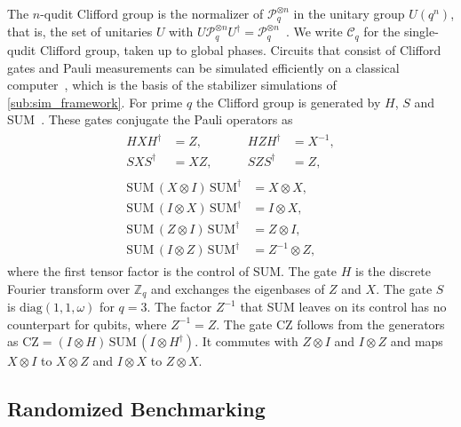 The $n$-qudit Clifford group is the normalizer of $\mathcal{P}_q^{\otimes n}$ in the unitary group $U(q^n)$, that is, the set of unitaries $U$ with $U \mathcal{P}_q^{\otimes n} U^\dagger = \mathcal{P}_q^{\otimes n}$~\cite{Gottesman1999}. We write $\mathcal{C}_q$ for the single-qudit Clifford group, taken up to global phases. Circuits that consist of Clifford gates and Pauli measurements can be simulated efficiently on a classical computer~\cite{Gottesman1998}, which is the basis of the stabilizer simulations of \autoref{sub:sim_framework}. For prime $q$ the Clifford group is generated by $H$, $S$ and SUM~\cite{Hostens2005}. These gates conjugate the Pauli operators as
\begin{equation}
  \begin{gathered}
    \begin{aligned}
      H X H^\dagger &= Z, &\qquad H Z H^\dagger &= X^{-1}, \\
      S X S^\dagger &= X Z, &\qquad S Z S^\dagger &= Z,
    \end{aligned} \\
    \begin{aligned}
      \mathrm{SUM}\,(X \otimes I)\,\mathrm{SUM}^\dagger &= X \otimes X, \\
      \mathrm{SUM}\,(I \otimes X)\,\mathrm{SUM}^\dagger &= I \otimes X, \\
      \mathrm{SUM}\,(Z \otimes I)\,\mathrm{SUM}^\dagger &= Z \otimes I, \\
      \mathrm{SUM}\,(I \otimes Z)\,\mathrm{SUM}^\dagger &= Z^{-1} \otimes Z,
    \end{aligned}
  \end{gathered}
  \label{eq:bg-conjugation}
\end{equation}
where the first tensor factor is the control of SUM. The gate $H$ is the discrete Fourier transform over $\mathbb{Z}_q$ and exchanges the eigenbases of $Z$ and $X$. The gate $S$ is $\mathrm{diag}(1, 1, \omega)$ for $q = 3$. The factor $Z^{-1}$ that SUM leaves on its control has no counterpart for qubits, where $Z^{-1} = Z$. The gate CZ follows from the generators as $\mathrm{CZ} = (I \otimes H)\,\mathrm{SUM}\,(I \otimes H^\dagger)$. It commutes with $Z \otimes I$ and $I \otimes Z$ and maps $X \otimes I$ to $X \otimes Z$ and $I \otimes X$ to $Z \otimes X$.

\subsection{Randomized Benchmarking}
\label{app:background-rb}

